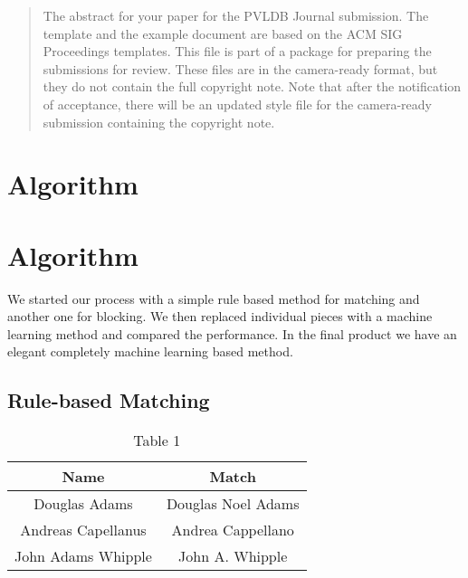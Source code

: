 \documentclass{vldb}
\begin{document}
\date{30 July 1999}


\maketitle

\begin{abstract}
The abstract for your paper for the PVLDB Journal submission.
The template and the example document are based on the ACM SIG Proceedings  templates. This file is part of a package for preparing the submissions for review. These files are in the camera-ready format, but they do not contain the full copyright note.
Note that after the notification of acceptance, there will be an updated style file for the camera-ready submission containing the copyright note.
\end{abstract}



\section{Algorithm}

\section{Algorithm}
We started our process with a simple rule based method for matching and another one for blocking. We then replaced individual pieces with a machine learning method and compared the performance. In the final product we have an elegant completely machine learning based method.

\subsection{Rule-based Matching}
\begin{table}
\centering
\caption{Table 1}
\begin{tabular}{|c|c|} \hline
Name&Match\\ \hline
Douglas Adams&Douglas Noel Adams\\ \hline
Andreas Capellanus&Andrea Cappellano \\ \hline
John Adams Whipple&John A. Whipple \\
\hline\end{tabular}
\end{table}
\end{document}
